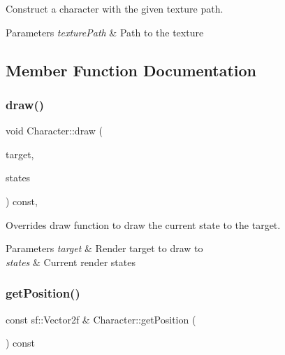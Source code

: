 Construct a character with the given texture path. 


\begin{DoxyParams}{Parameters}
{\em texture\+Path} & Path to the texture \\
\hline
\end{DoxyParams}


\subsection{Member Function Documentation}
\mbox{\label{class_character_a3812c72bf1cf8090f67a3387b5d96753}} 
\subsubsection{\texorpdfstring{draw()}{draw()}}
{\footnotesize\ttfamily void Character\+::draw (\begin{DoxyParamCaption}\item[{sf\+::\+Render\+Target \&}]{target,  }\item[{sf\+::\+Render\+States}]{states }\end{DoxyParamCaption}) const\hspace{0.3cm}{\ttfamily [protected]}, {\ttfamily [virtual]}}



Overrides draw function to draw the current state to the target. 


\begin{DoxyParams}{Parameters}
{\em target} & Render target to draw to \\
\hline
{\em states} & Current render states \\
\hline
\end{DoxyParams}
\mbox{\label{class_character_aa07e2cfa12d28c14a1843455df396ee6}} 
\subsubsection{\texorpdfstring{get\+Position()}{getPosition()}}
{\footnotesize\ttfamily const sf\+::\+Vector2f \& Character\+::get\+Position (\begin{DoxyParamCaption}{ }\end{DoxyParamCaption}) const}



